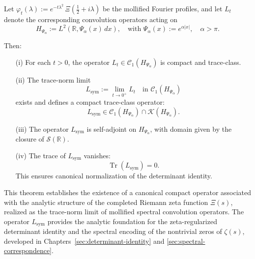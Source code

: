 \begin{theorem}
\label{thm:existence_Lsym}
Let \( \varphi_t(\lambda) := e^{-t\lambda^2} \, \Xi\left( \tfrac{1}{2} + i\lambda \right) \) be the mollified Fourier profiles, and let \( L_t \) denote the corresponding convolution operators acting on
\[
H_{\Psi_\alpha} := L^2(\mathbb{R}, \Psi_\alpha(x)\, dx), \quad \text{with } \Psi_\alpha(x) := e^{\alpha |x|}, \quad \alpha > \pi.
\]

Then:
\begin{enumerate}
  \item[\textnormal{(i)}] For each \( t > 0 \), the operator \( L_t \in \mathcal{C}_1(H_{\Psi_\alpha}) \) is compact and trace-class.

  \item[\textnormal{(ii)}] The trace-norm limit
  \[
  L_{\mathrm{sym}} := \lim_{t \to 0^+} L_t \quad \text{in } \mathcal{C}_1(H_{\Psi_\alpha})
  \]
  exists and defines a compact trace-class operator:
  \[
  L_{\mathrm{sym}} \in \mathcal{C}_1(H_{\Psi_\alpha}) \cap \mathcal{K}(H_{\Psi_\alpha}).
  \]

  \item[\textnormal{(iii)}] The operator \( L_{\mathrm{sym}} \) is self-adjoint on \( H_{\Psi_\alpha} \), with domain given by the closure of \( \mathcal{S}(\mathbb{R}) \).

  \item[\textnormal{(iv)}] The trace of \( L_{\mathrm{sym}} \) vanishes:
  \[
  \operatorname{Tr}(L_{\mathrm{sym}}) = 0.
  \]
  This ensures canonical normalization of the determinant identity.
\end{enumerate}

\medskip
\noindent
This theorem establishes the existence of a canonical compact operator associated with the analytic structure of the completed Riemann zeta function \( \Xi(s) \), realized as the trace-norm limit of mollified spectral convolution operators. The operator \( L_{\mathrm{sym}} \) provides the analytic foundation for the zeta-regularized determinant identity and the spectral encoding of the nontrivial zeros of \( \zeta(s) \), developed in Chapters~\ref{sec:determinant-identity} and \ref{sec:spectral-correspondence}.
\end{theorem}
